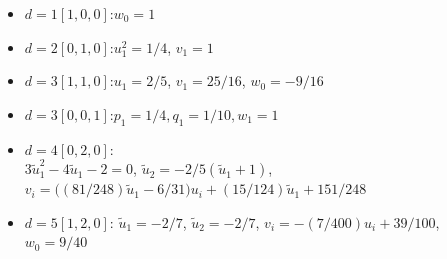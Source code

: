 \documentclass{article}
\begin{document}
\begin{itemize}
\item $d=1$\quad $[1,0,0]$:\quad $w_0=1$

\item $d=2$\quad $[0,1,0]$:\quad $u_1^2 = 1/4$, $v_1=1$

\item $d=3$\quad $[1,1,0]$:\quad $u_1 = 2/5$, $v_1=25/16$, $w_0=-9/16$

\item $d=3$\quad $[0,0,1]$:\quad $p_1 = 1/4, q_1 = 1/10, w_1 = 1$

\item $d=4$\quad $[0,2,0]$:\\
      $3 \tilde{u}_1^2 - 4 \tilde{u}_1 - 2 = 0$, $\tilde{u}_2=-2/5 (\tilde{u}_1+1)$,
      $v_i = \big((81/248)\tilde{u}_1-6/31\big) u_i + (15/124) \tilde{u}_1 + 151/248$

\item $d=5$\quad $[1,2,0]$: $\tilde{u}_1 = -2/7$, $\tilde{u}_2= -2/7$, $v_i = -(7/400) u_i + 39/100$, $w_0=9/40$


\end{itemize}
\end{document}
